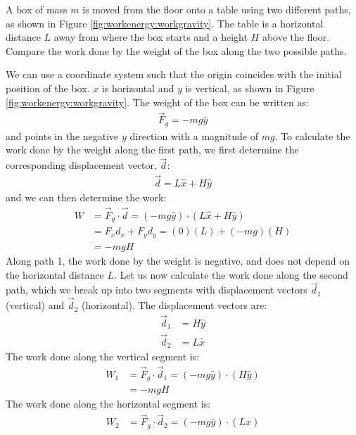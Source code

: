 \begin{example}{\label{ex:workenergy:workgravity}
A box of mass $m$ is moved from the floor onto a table using two different paths, as shown in Figure \ref{fig:workenergy:workgravity}. The table is a horizontal distance $L$ away from where the box starts and a height $H$ above the floor. Compare the work done by the weight of the box along the two possible paths.
}

We can use a coordinate system such that the origin coincides with the initial position of the box. $x$ is horizontal and $y$ is vertical, as shown in Figure \ref{fig:workenergy:workgravity}. The weight of the box can be written as:
\begin{align*}
\vec F_g = -mg \hat y
\end{align*}
and points in the negative $y$ direction with a magnitude of $mg$. To calculate the work done by the weight along the first path, we first determine the corresponding displacement vector, $\vec d$:
\begin{align*}
\vec d = L\hat x + H\hat y
\end{align*}
and we can then determine the work:
\begin{align*}
W &= \vec F_g \cdot \vec d = (-mg \hat y) \cdot (L\hat x + H\hat y)\\
&=F_xd_x+F_yd_y= (0)(L) + (-mg)(H)\\
&= -mgH
\end{align*}
Along path 1, the work done by the weight is negative, and does not depend on the horizontal distance $L$. Let us now calculate the work done along the second path, which we break up into two segments with displacement vectors $\vec d_1$ (vertical) and $\vec d_2$ (horizontal). The displacement vectors are:
\begin{align*}
\vec d_1 &= H\hat y\\
\vec d_2 &= L\hat x
\end{align*}
The work done along the vertical segment is:
\begin{align*}
W_1 &= \vec F_g \cdot \vec d_1 = (-mg \hat y) \cdot (H\hat y)\\
&=-mgH
\end{align*}
The work done along the horizontal segment is:
\begin{align*}
W_2 &= \vec F_g \cdot \vec d_2 = (-mg \hat y) \cdot (L\hat x)\\

\end{align*}
\end{example}

